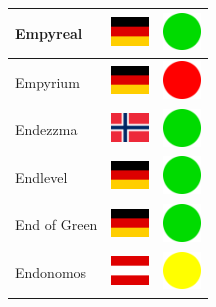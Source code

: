 \documentclass[12pt, a4paper, twoside]{report}
\begin{document}
\begin{center}
\begin{longtable}{|p{5cm}|p{2cm}|p{2cm}|}
 Empyreal                                                   & \includegraphics[width=1cm]{../4x3/de} &   \includegraphics[width=1cm]{../likes/y} \\ \hline
 Empyrium                                                   & \includegraphics[width=1cm]{../4x3/de} &   \includegraphics[width=1cm]{../likes/n} \\ \hline
 Endezzma                                                   & \includegraphics[width=1cm]{../4x3/no} &   \includegraphics[width=1cm]{../likes/y} \\ \hline
 Endlevel                                                   & \includegraphics[width=1cm]{../4x3/de} &   \includegraphics[width=1cm]{../likes/y} \\ \hline
 End of Green                                               & \includegraphics[width=1cm]{../4x3/de} &   \includegraphics[width=1cm]{../likes/y} \\ \hline
 Endonomos                                                  & \includegraphics[width=1cm]{../4x3/at} &   \includegraphics[width=1cm]{../likes/m} \\ \hline

\end{longtable}
\end{center}
\end{document}

